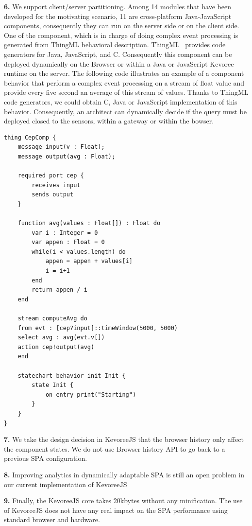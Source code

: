 \indent \textbf{6.} We support client/server partitioning. Among 14 modules that have been developed for the motivating scenario, 11 are cross-platform Java-JavaScript components, consequently they can run on the server side or on the client side.  One of the component, which is in charge of doing complex event processing is generated from ThingML behavioral description. ThingML~\cite{DBLP:conf/models/FleureyMSB11} provides code generators for Java, JavaScript, and C. Consequently this component can be deployed dynamically on the Browser or within a Java or JavaScript Kevoree runtime on the server.  The following code illustrates an example of a component behavior that perform a complex event processing on a stream of float value and provide every five second an average of this stream of values. Thanks to ThingML code generators, we could obtain C, Java or JavaScript implementation of this behavior. Consequently, an architect can dynamically decide if the query must be deployed closed to the sensors, within a gateway or within the bowser.

\begin{lstlisting}[language=ThingML,frame=none,caption={Excerpt of a component implementation defined using ThingML}]
thing CepComp {
	message input(v : Float);
	message output(avg : Float);

	required port cep {
		receives input
		sends output
	}

	function avg(values : Float[]) : Float do
		var i : Integer = 0
		var appen : Float = 0
		while(i < values.length) do
			appen = appen + values[i]
			i = i+1
		end
		return appen / i
	end

	stream computeAvg do
	from evt : [cep?input]::timeWindow(5000, 5000)
	select avg : avg(evt.v[])
	action cep!output(avg)
	end

	statechart behavior init Init {
		state Init {
			on entry print("Starting")
		}
	}
}
\end{lstlisting}



\indent \textbf{7.} We take the design decision in KevoreeJS that the browser history only affect the component states. We do not use Browser history API to go back to a previous SPA configuration.

\indent \textbf{8.} Improving analytics in dynamically adaptable SPA is still an open problem in our current implementation of KevoreeJS

\indent \textbf{9.} Finally, the KevoreeJS core takes 20kbytes without any minification. The use of KevoreeJS does not have any real impact on the SPA performance using standard browser and hardware.
